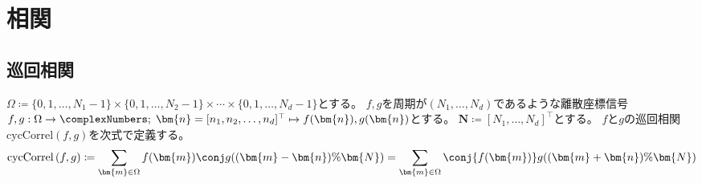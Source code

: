 \part{相関}
    \chapter{巡回相関}
        \newcommand{\cycCorrel}[2]{\mathrm{cycCorrel}\left(#1,#2\right)}
        $\Omega \coloneq \{0,1,\dots,N_1-1\}\times\{0,1,\dots,N_2-1\}\times\cdots\times\{0,1,\dots,N_d-1\}$とする。
        $f,g$を周期が$(N_1,\dots,N_d)$であるような離散座標信号$f,g: \Omega\to\complexNumbers;\;\bm{n} = [n_1,n_2,\dots,n_d]^\top \mapsto f(\bm{n}),g(\bm{n})$とする。
        $\bm{N} \coloneq [N_1,\dots,N_d]^\top$とする。
        $f$と$g$の巡回相関$\cycCorrel{f}{g}$を次式で定義する。
        \[ \cycCorrel{f}{g} \coloneq \sum_{\bm{m}\in\Omega} f(\bm{m})\conj{g((\bm{m}-\bm{n})\%\bm{N})} = \sum_{\bm{m}\in\Omega} \conj{f(\bm{m})}g((\bm{m}+\bm{n})\%\bm{N}) \]